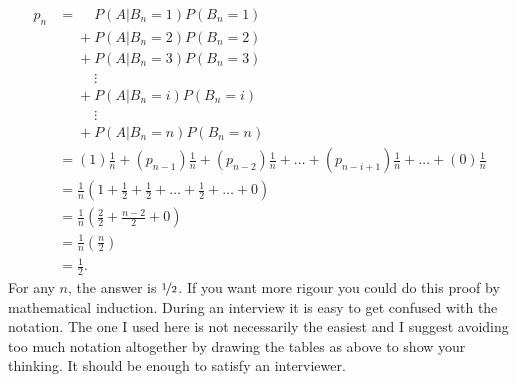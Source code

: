 \documentclass[a4paper]{article}
\begin{document}
\begin{align*}
  p_n
  &=
   \phantom{{} + {}}     P(A|B_n = 1)P(B_n=1) \\
  &\phantom{{} = {}} + P(A|B_n = 2)P(B_n=2) \\
  &\phantom{{} = {}} + P(A|B_n = 3)P(B_n=3) \\
  &\phantom{{} = {}}\phantom{{} + {}} \vdots  \\
  &\phantom{{} = {}} +  P(A|B_n = i)P(B_n=i) \\
  &\phantom{{} = {}}\phantom{{} + {}} \vdots  \\
  &\phantom{{} = {}} +  P(A|B_n = n)P(B_n=n) \\
&= (1)       \frac{1}{n}  +
   (p_{n-1}) \frac{1}{n}  +
   (p_{n-2}) \frac{1}{n}  +
  \ldots +
  (p_{n-i+1})\frac{1}{n} +
  \ldots +
  (0)        \frac{1}{n}  \\
&=\frac{1}{n}\left(1 +  \frac{1}{2} + \frac{1}{2} + \ldots + \frac{1}{2} + \ldots + 0\right) \\
&=\frac{1}{n}\left(\frac{2}{2} + \frac{n-2}{2} + 0\right) \\
&=\frac{1}{n}\left(\frac{n}{2}\right)  \\
&=\frac{1}{2}
\text{.}
\end{align*}
For any $n$, the answer is $\nicefrac{1}{2}$.
If you want more rigour you could do this proof by mathematical induction.
During an interview it is easy to get confused with the notation.
The one I used here is not necessarily the easiest and I suggest avoiding too much notation altogether by drawing the tables as above to show your thinking.
It should be enough to satisfy an interviewer.
\end{document}

